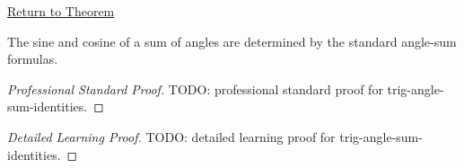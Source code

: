 \newpage
{}
\label{prf:trig-angle-sum-identities}

\begin{remark*}[Return]
\hyperref[thm:trig-angle-sum-identities]{Return to Theorem}
\end{remark*}

\begin{theorem*}
The sine and cosine of a sum of angles are determined by the standard
angle-sum formulas.
\end{theorem*}

\begin{proof}[Professional Standard Proof]
\LRAProofBodyStart
TODO: professional standard proof for trig-angle-sum-identities.
\end{proof}

\begin{proof}[Detailed Learning Proof]
\LRAProofBodyStart
TODO: detailed learning proof for trig-angle-sum-identities.
\end{proof}

\clearpage
